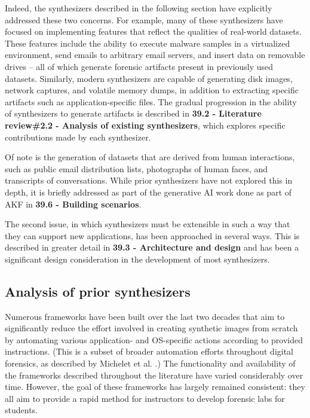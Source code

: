 Indeed, the synthesizers described in the following section have
explicitly addressed these two concerns. For example, many of these
synthesizers have focused on implementing features that reflect the
qualities of real-world datasets. These features include the ability to
execute malware samples in a virtualized environment, send emails to
arbitrary email servers, and insert data on removable drives -- all of
which generate forensic artifacts present in previously used datasets.
Similarly, modern synthesizers are capable of generating disk images,
network captures, and volatile memory dumps, in addition to extracting
specific artifacts such as application-specific files. The gradual
progression in the ability of synthesizers to generate artifacts is
described in \textbf{39.2 - Literature review\#2.2 - Analysis of
existing synthesizers}, which explores specific contributions made by
each synthesizer.

Of note is the generation of datasets that are derived from human
interactions, such as public email distribution lists, photographs of
human faces, and transcripts of conversations. While prior synthesizers
have not explored this in depth, it is briefly addressed as part of the
generative AI work done as part of AKF in \textbf{39.6 - Building
scenarios}.

The second issue, in which synthesizers must be extensible in such a way
that they can support new applications, has been approached in several
ways. This is described in greater detail in \textbf{39.3 - Architecture
and design} and has been a significant design consideration in the
development of most synthesizers.

\subsection{Analysis of prior
synthesizers}\label{analysis-of-prior-synthesizers}

Numerous frameworks have been built over the last two decades that aim
to significantly reduce the effort involved in creating synthetic images
from scratch by automating various application- and OS-specific actions
according to provided instructions. (This is a subset of broader
automation efforts throughout digital forensics, as described by
Michelet et al. \cite{micheletAutomationDigitalForensics2023}.) The
functionality and availability of the frameworks described throughout
the literature have varied considerably over time. However, the goal of
these frameworks has largely remained consistent: they all aim to
provide a rapid method for instructors to develop forensic labs for
students.

